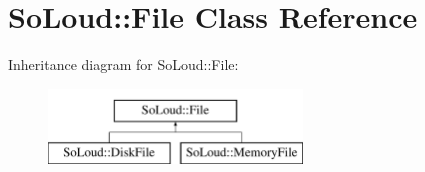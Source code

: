\hypertarget{class_so_loud_1_1_file}{}\section{So\+Loud\+::File Class Reference}
\label{class_so_loud_1_1_file}
Inheritance diagram for So\+Loud\+::File\+:\begin{figure}[H]
\begin{center}
\leavevmode
\includegraphics[height=2.000000cm]{class_so_loud_1_1_file}
\end{center}
\end{figure}
